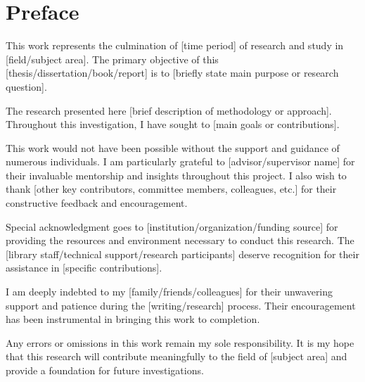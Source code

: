 
\chapter*{Preface}

This work represents the culmination of [time period] of research and study in [field/subject area]. The primary objective of this [thesis/dissertation/book/report] is to [briefly state main purpose or research question].

The research presented here [brief description of methodology or approach]. Throughout this investigation, I have sought to [main goals or contributions].

This work would not have been possible without the support and guidance of numerous individuals. I am particularly grateful to [advisor/supervisor name] for their invaluable mentorship and insights throughout this project. I also wish to thank [other key contributors, committee members, colleagues, etc.] for their constructive feedback and encouragement.

Special acknowledgment goes to [institution/organization/funding source] for providing the resources and environment necessary to conduct this research. The [library staff/technical support/research participants] deserve recognition for their assistance in [specific contributions].

I am deeply indebted to my [family/friends/colleagues] for their unwavering support and patience during the [writing/research] process. Their encouragement has been instrumental in bringing this work to completion.

Any errors or omissions in this work remain my sole responsibility. It is my hope that this research will contribute meaningfully to the field of [subject area] and provide a foundation for future investigations.
\vspace{1cm}
